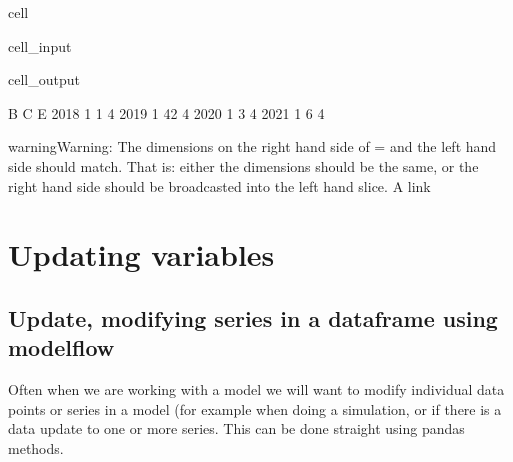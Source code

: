 \documentclass[letterpaper,10pt,english]{jupyterBook}
\begin{document}
\begin{sphinxuseclass}{cell}\begin{sphinxVerbatimInput}

\begin{sphinxuseclass}{cell_input}
\begin{sphinxVerbatim}[commandchars=\\\{\}]
\PYG{p}{[}\PYG{p}{]}  
\end{sphinxVerbatim}

\end{sphinxuseclass}\end{sphinxVerbatimInput}
\begin{sphinxVerbatimOutput}

\begin{sphinxuseclass}{cell_output}
\begin{sphinxVerbatim}[commandchars=\\\{\}]
      B   C  E
2018  1   1  4
2019  1  42  4
2020  1   3  4
2021  1   6  4
\end{sphinxVerbatim}

\end{sphinxuseclass}\end{sphinxVerbatimOutput}

\end{sphinxuseclass}
\begin{sphinxadmonition}{warning}{Warning:}
\sphinxAtStartPar
The dimensions on the right hand side of = and the left hand side should match. That is: either the dimensions should be the same, or the right hand side should be broadcasted into the left hand slice.
A link 
\end{sphinxadmonition}

\sphinxstepscope


\part{Updating variables}

\sphinxstepscope


\chapter{Update, modifying series in a dataframe using modelflow}
\label{\detokenize{content/howto/update/model update:update-modifying-series-in-a-dataframe-using-modelflow}}\label{\detokenize{content/howto/update/model update:upd}}\label{\detokenize{content/howto/update/model update::doc}}
\sphinxAtStartPar
Often when we are working with a model we will want to modify individual data points or series in a model (for example when doing a simulation, or if there is a data update to one or more series.
This can be done straight using pandas methods.
\end{document}

